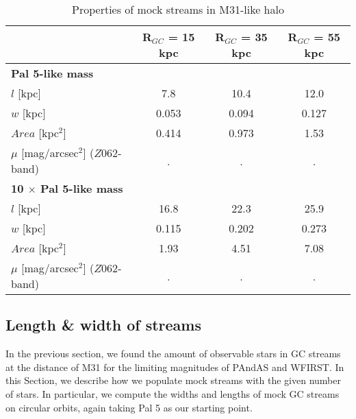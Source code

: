 \documentclass[twocolumn]{aastex62}
\begin{document}
\begin{table*}
\centering
\caption{Properties of mock streams in M31-like halo}
\label{tab:Pal5}
\begin{tabular}{lccc}
\hline
 & {\bf R$_{GC}$ = 15 kpc }&  {\bf R$_{GC}$ = 35 kpc} &  {\bf R$_{GC}$ = 55 kpc} \\ 
 \hline
{\bf Pal 5-like mass} & &&\\
$l$ [kpc] & 7.8 & 10.4 &  12.0  \\
$w$ [kpc] & 0.053 & 0.094  & 0.127  \\
$Area$ [kpc$^2$] & 0.414 & 0.973 &1.53 \\
$\mu$ [mag/arcsec$^2$] ($Z062$-band) &. &.  &.  \\
\hline
{\bf 10 $\times$ Pal 5-like mass} & &&\\ 
$l$ [kpc] &16.8 & 22.3 & 25.9 \\
$w$ [kpc]& 0.115 & 0.202 & 0.273  \\
$Area$ [kpc$^2$] &  1.93& 4.51   & 7.08  \\
$\mu$ [mag/arcsec$^2$] ($Z062$-band) &. &.  &.  \\

\hline 
\end{tabular}
\end{table*}



\subsection{Length \& width of streams}
\label{sec:length}
In the previous section, we found the amount of observable stars in GC streams at the distance of M31 for the limiting magnitudes of PAndAS and WFIRST. In this Section, we describe how we populate mock streams with the given number of stars. In particular, we compute the widths and lengths of mock GC streams on circular orbits, again taking Pal 5 as our starting point. 
\end{document}
